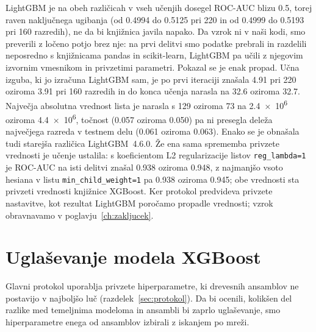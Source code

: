 \documentclass[a4paper,12pt,openright]{book}
\begin{document}
LightGBM je na obeh različicah v vseh učenjih dosegel ROC-AUC blizu \num{0.5},
torej raven naključnega ugibanja (od \num{0.4994} do \num{0.5125} pri 220 in od
\num{0.4999} do \num{0.5193} pri 160 razredih), ne da bi knjižnica javila
napako. Da vzrok ni v naši kodi, smo preverili z ločeno potjo brez nje: na prvi
delitvi smo podatke prebrali in razdelili neposredno s knjižnicama pandas in
scikit-learn, LightGBM pa učili z njegovim izvornim vmesnikom in privzetimi
parametri. Pokazal se je enak propad. Učna izguba, ki jo izračuna LightGBM sam,
je po prvi iteraciji znašala \num{4.91} pri 220 oziroma \num{3.91} pri 160
razredih in do konca učenja narasla na \num{32.6} oziroma \num{32.7}. Največja
absolutna vrednost lista je narasla s \num{129} oziroma \num{73} na
\num{2.4e6} oziroma \num{4.4e6}, točnost (\num{0.057} oziroma \num{0.050}) pa ni
presegla deleža največjega razreda v testnem delu (\num{0.061} oziroma
\num{0.063}). Enako se je obnašala tudi starejša različica LightGBM~4.6.0. Že ena
sama sprememba privzete vrednosti je učenje ustalila: s koeficientom L2
regularizacije listov \texttt{reg\_lambda=1} je ROC-AUC na isti delitvi znašal
\num{0.938} oziroma \num{0.948}, z najmanjšo vsoto hesiana v listu
\texttt{min\_child\_weight=1} pa \num{0.938} oziroma \num{0.945}; obe vrednosti
sta privzeti vrednosti knjižnice XGBoost. Ker protokol predvideva privzete
nastavitve, kot rezultat LightGBM poročamo propadle vrednosti; vzrok obravnavamo
v poglavju~\ref{ch:zakljucek}.

\section{Uglaševanje modela XGBoost}
\label{sec:rez-uglasevanje}

Glavni protokol uporablja privzete hiperparametre, ki drevesnih ansamblov ne
postavijo v najboljšo luč (razdelek~\ref{sec:protokol}). Da bi ocenili, kolikšen
del razlike med temeljnima modeloma in ansambli bi zaprlo uglaševanje, smo
hiperparametre enega od ansamblov izbirali z iskanjem po mreži.
\end{document}
